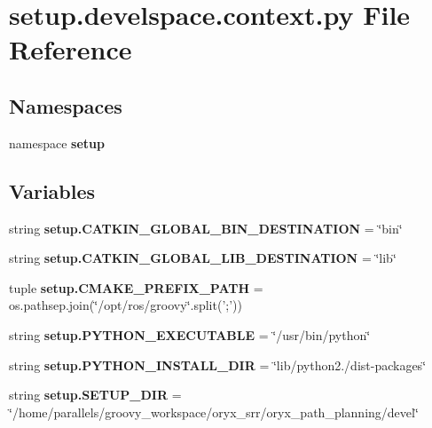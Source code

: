 \section{setup.\-develspace.\-context.\-py \-File \-Reference}
\label{setup_8develspace_8context_8py}
\subsection*{\-Namespaces}
\begin{DoxyCompactItemize}
\item 
namespace {\bf setup}
\end{DoxyCompactItemize}
\subsection*{\-Variables}
\begin{DoxyCompactItemize}
\item 
string {\bf setup.\-C\-A\-T\-K\-I\-N\-\_\-\-G\-L\-O\-B\-A\-L\-\_\-\-B\-I\-N\-\_\-\-D\-E\-S\-T\-I\-N\-A\-T\-I\-O\-N} = \char`\"{}bin\char`\"{}
\item 
string {\bf setup.\-C\-A\-T\-K\-I\-N\-\_\-\-G\-L\-O\-B\-A\-L\-\_\-\-L\-I\-B\-\_\-\-D\-E\-S\-T\-I\-N\-A\-T\-I\-O\-N} = \char`\"{}lib\char`\"{}
\item 
tuple {\bf setup.\-C\-M\-A\-K\-E\-\_\-\-P\-R\-E\-F\-I\-X\-\_\-\-P\-A\-T\-H} = os.\-pathsep.\-join(\char`\"{}/opt/ros/groovy\char`\"{}.split(';'))
\item 
string {\bf setup.\-P\-Y\-T\-H\-O\-N\-\_\-\-E\-X\-E\-C\-U\-T\-A\-B\-L\-E} = \char`\"{}/usr/bin/python\char`\"{}
\item 
string {\bf setup.\-P\-Y\-T\-H\-O\-N\-\_\-\-I\-N\-S\-T\-A\-L\-L\-\_\-\-D\-I\-R} = \char`\"{}lib/python2./dist-\/packages\char`\"{}
\item 
string {\bf setup.\-S\-E\-T\-U\-P\-\_\-\-D\-I\-R} = \char`\"{}/home/parallels/groovy\-\_\-workspace/oryx\-\_\-srr/oryx\-\_\-path\-\_\-planning/devel\char`\"{}
\end{DoxyCompactItemize}
